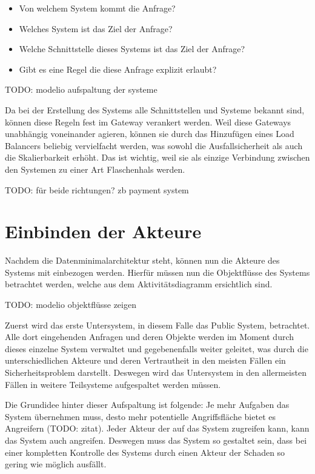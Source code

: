 \begin{itemize}
  \item Von welchem System kommt die Anfrage?
  \item Welches System ist das Ziel der Anfrage?
  \item Welche Schnittstelle dieses Systems ist das Ziel der Anfrage?
  \item Gibt es eine Regel die diese Anfrage explizit erlaubt?
\end{itemize}

TODO: modelio aufspaltung der systeme

Da bei der Erstellung des Systems alle Schnittstellen und Systeme bekannt sind, können diese Regeln fest im Gateway verankert werden. Weil diese Gateways unabhängig voneinander agieren, können sie durch das Hinzufügen eines Load Balancers beliebig vervielfacht werden, was sowohl die Ausfallsicherheit als auch die Skalierbarkeit erhöht. Das ist wichtig, weil sie als einzige Verbindung zwischen den Systemen zu einer Art Flaschenhals werden.

TODO: für beide richtungen? zb payment system

\section{Einbinden der Akteure}
Nachdem die Datenminimalarchitektur steht, können nun die Akteure des Systems mit einbezogen werden. Hierfür müssen nun die Objektflüsse des Systems betrachtet werden, welche aus dem Aktivitätsdiagramm ersichtlich sind.

TODO: modelio objektflüsse zeigen

Zuerst wird das erste Untersystem, in diesem Falle das Public System, betrachtet. Alle dort eingehenden Anfragen und deren Objekte werden im Moment durch dieses einzelne System verwaltet und gegebenenfalls weiter geleitet, was durch die unterschiedlichen Akteure und deren Vertrautheit in den meisten Fällen ein Sicherheitsproblem darstellt. Deswegen wird das Untersystem in den allermeisten Fällen in weitere Teilsysteme aufgespaltet werden müssen.

Die Grundidee hinter dieser Aufspaltung ist folgende: Je mehr Aufgaben das System übernehmen muss, desto mehr potentielle Angriffsfläche bietet es Angreifern (TODO: zitat). Jeder Akteur der auf das System zugreifen kann, kann das System auch angreifen. Deswegen muss das System so gestaltet sein, dass bei einer kompletten Kontrolle des Systems durch einen Akteur der Schaden so gering wie möglich ausfällt.


